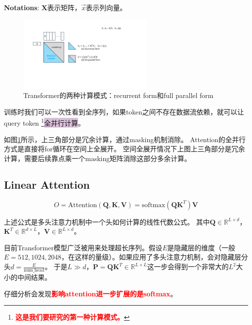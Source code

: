 \noindent \textbf{Notations}: $\mathbf{X}$表示矩阵，$\vec{x}$表示列向量。

\begin{figure}[h]
    \centering
    \includegraphics[width=0.6\textwidth]{figures/attention-train.pdf}
    \caption{Transformer的两种计算模式：recurrent form和full parallel form}\label{fig:attention-train}
\end{figure}

训练时我们可以一次性看到全序列，如果token之间不存在数据流依赖，就可以让query token
\footnote{\textbf{\textcolor{red}{这是我们要研究的第一种计算模式。}}}{\colorbox{thistle}{全并行计算}}。

如图\ref{fig:attention-train}所示，上三角部分是冗余计算，通过masking机制消除。
Attention的全并行方式是直接将for循环在空间上全展开。
空间全展开情况下上图上三角部分是冗余计算，需要后续靠点乘一个masking矩阵消除这部分多余计算。

\subsection{Linear Attention\cite{linear-attention-kexue}}

\begin{equation}
O = \text{Attention}(\mathbf{Q},\mathbf{K},\mathbf{V}) = \text{softmax}(\mathbf{Q}\mathbf{K}^T)\mathbf{V} \label{eq:attn1}
\end{equation}

上述公式是多头注意力机制中一个头如何计算的线性代数公式。
其中$\mathbf{Q} \in \mathbb{R}^{L \times d}$，$\mathbf{K}^T \in \mathbb{R}^{d \times L}$，$\mathbf{V} \in \mathbb{R}^{L \times d}$。

目前Transformer模型广泛被用来处理超长序列。假设$E$是隐藏层的维度（一般$E = 512,1024,2048$，在这样的量级）。如果应用了多头注意力机制，会对隐藏层分头$d = \frac{E}{\text{num\_head}}$。
于是$L\gg d$，$\mathbf{P} = \mathbf{Q}\mathbf{K}^T \in \mathbb{R}^{L \times L}$这一步会得到一个非常大的$L^2$大小的中间结果。

仔细分析会发现\textbf{\textcolor{red}{影响attention进一步扩展的是softmax}}。

